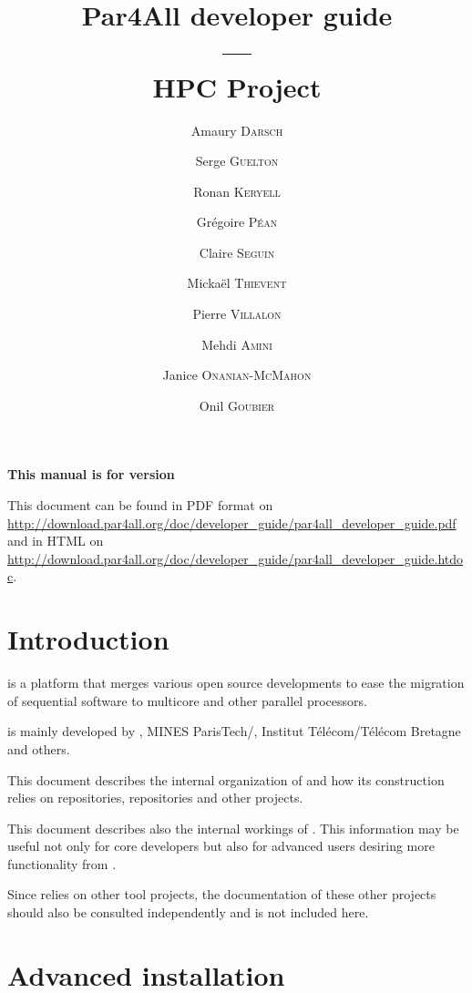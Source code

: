 \documentclass[a4paper]{article}
\newcommand{\LINK}[1]{\url{#1}\xspace}
\newcommand{\PfaOrganizationPDF}{\LINK{http://download.par4all.org/doc/developer_guide/par4all_developer_guide.pdf}}
\newcommand{\PfaAllOrganizationHTDOC}{\LINK{http://download.par4all.org/doc/developer_guide/par4all_developer_guide.htdoc}}
\begin{document}
\title{Par4All developer guide\\
  ---\\
  HPC Project}

\author{Amaury \textsc{Darsch} \and Serge \textsc{Guelton} \and Ronan
  \textsc{Keryell} \and Grégoire \textsc{Péan} \and Claire \textsc{Seguin}
  \and Mickaël \textsc{Thievent} \and Pierre \textsc{Villalon}
  \and Mehdi \textsc{Amini} \and Janice \textsc{Onanian-McMahon}
  \and Onil \textsc{Goubier}}

\maketitle

\noindent\textbf{This manual is for \Apfa version }
\bigskip

This document can be found in PDF format on \PfaOrganizationPDF and in HTML
on \PfaAllOrganizationHTDOC.



\section{Introduction}
\label{sec:introduction}

\Apfa is a platform that merges various open source developments to ease
the migration of sequential software to multicore and other parallel
processors.

\Apfa is mainly developed by \Ahpcp, MINES ParisTech/\Acri, Institut
Télécom/Télécom Bretagne and others.

This document describes the internal organization of \Apfa and how its
construction relies on \Agit repositories, \Asvn repositories and other
projects.

This document describes also the internal workings of \Apfa.
This information may be useful not only for \Apfa core developers but
also for advanced users desiring more functionality from \Apfa.

Since \Apfa relies on other tool projects, the documentation of these other
projects should also be consulted independently and is not included here.

\tableofcontents{}

\bigskip{}


\section{Advanced installation}
\label{sec:advanced_installation}
\end{document}
